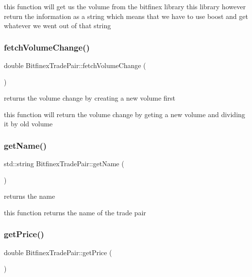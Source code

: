 this function will get us the volume from the bitfinex library this library however return the information as a string which means that we have to use boost and get whatever we went out of that string \mbox{\label{class_bitfinex_trade_pair_ac87f08ef5793dbb17b04798227400aab}} 
\subsubsection{\texorpdfstring{fetch\+Volume\+Change()}{fetchVolumeChange()}}
{\footnotesize\ttfamily double Bitfinex\+Trade\+Pair\+::fetch\+Volume\+Change (\begin{DoxyParamCaption}{ }\end{DoxyParamCaption})}



returns the volume change by creating a new volume first 

this function will return the volume change by geting a new volume and dividing it by old volume \mbox{\label{class_bitfinex_trade_pair_ac00dfde40f1d2a1d00bf8054d442bfac}} 
\subsubsection{\texorpdfstring{get\+Name()}{getName()}}
{\footnotesize\ttfamily std\+::string Bitfinex\+Trade\+Pair\+::get\+Name (\begin{DoxyParamCaption}{ }\end{DoxyParamCaption})}



returns the name 

this function returns the name of the trade pair \mbox{\label{class_bitfinex_trade_pair_a4dc226e8c0dcadbb0ea39381428721a6}} 
\subsubsection{\texorpdfstring{get\+Price()}{getPrice()}}
{\footnotesize\ttfamily double Bitfinex\+Trade\+Pair\+::get\+Price (\begin{DoxyParamCaption}{ }\end{DoxyParamCaption})}



